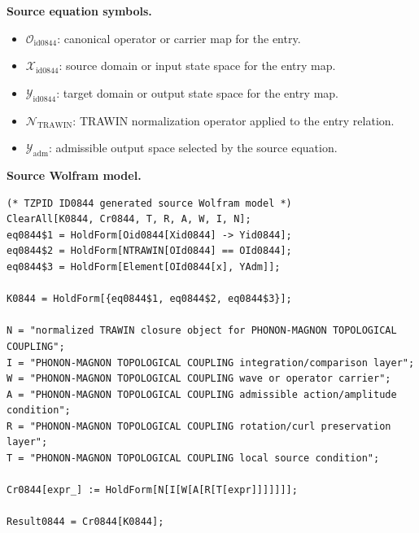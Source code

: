 \begin{minipage}[t]{0.49\linewidth}
\begingroup
\small
\raggedright
\textbf{Source equation symbols.}\par
\begin{itemize}[leftmargin=1.35em,itemsep=1pt,topsep=1pt,parsep=0pt]
    \item $\mathcal{O}_{\mathrm{id0844}}$: canonical operator or carrier map for the entry.
    \item $\mathcal{X}_{\mathrm{id0844}}$: source domain or input state space for the entry map.
    \item $\mathcal{Y}_{\mathrm{id0844}}$: target domain or output state space for the entry map.
    \item $\mathcal{N}_{\mathrm{TRAWIN}}$: TRAWIN normalization operator applied to the entry relation.
    \item $\mathcal{Y}_{\mathrm{adm}}$: admissible output space selected by the source equation.
\end{itemize}
\endgroup
\end{minipage}\hfill
\begin{minipage}[t]{0.47\linewidth}
\begingroup
\scriptsize
\raggedright
\textbf{Source Wolfram model.}\par
\begin{Verbatim}[fontsize=\tiny,breaklines=true,breakanywhere=true]
(* TZPID ID0844 generated source Wolfram model *)
ClearAll[K0844, Cr0844, T, R, A, W, I, N];
eq0844$1 = HoldForm[Oid0844[Xid0844] -> Yid0844];
eq0844$2 = HoldForm[NTRAWIN[OId0844] == OId0844];
eq0844$3 = HoldForm[Element[OId0844[x], YAdm]];

K0844 = HoldForm[{eq0844$1, eq0844$2, eq0844$3}];

N = "normalized TRAWIN closure object for PHONON-MAGNON TOPOLOGICAL COUPLING";
I = "PHONON-MAGNON TOPOLOGICAL COUPLING integration/comparison layer";
W = "PHONON-MAGNON TOPOLOGICAL COUPLING wave or operator carrier";
A = "PHONON-MAGNON TOPOLOGICAL COUPLING admissible action/amplitude condition";
R = "PHONON-MAGNON TOPOLOGICAL COUPLING rotation/curl preservation layer";
T = "PHONON-MAGNON TOPOLOGICAL COUPLING local source condition";

Cr0844[expr_] := HoldForm[N[I[W[A[R[T[expr]]]]]]];

Result0844 = Cr0844[K0844];
\end{Verbatim}
\endgroup
\end{minipage}

